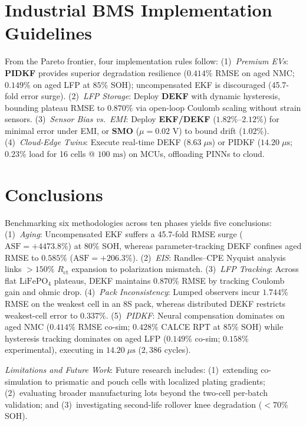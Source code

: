 \documentclass[preprint,12pt]{elsarticle}
\begin{document}
\section{Industrial BMS Implementation Guidelines}
From the Pareto frontier, four implementation rules follow: (1)~\emph{Premium EVs}: \textbf{PIDKF} provides superior degradation resilience ($0.414\%$ RMSE on aged NMC; $0.149\%$ on aged LFP at $85\%$ SOH); uncompensated EKF is discouraged (45.7-fold error surge). (2)~\emph{LFP Storage}: Deploy \textbf{DEKF} with dynamic hysteresis, bounding plateau RMSE to $0.870\%$ via open-loop Coulomb scaling without strain sensors. (3)~\emph{Sensor Bias vs.\ EMI}: Deploy \textbf{EKF/DEKF} ($1.82\%\text{--}2.12\%$) for minimal error under EMI, or \textbf{SMO} ($\mu = 0.02\text{ V}$) to bound drift ($1.02\%$). (4)~\emph{Cloud-Edge Twins}: Execute real-time DEKF ($8.63\;\mu\text{s}$) or PIDKF ($14.20\;\mu\text{s}$; $0.23\%$ load for 16 cells @ $100\text{ ms}$) on MCUs, offloading PINNs to cloud.

\section{Conclusions}
Benchmarking six methodologies across ten phases yields five conclusions: 
(1)~\emph{Aging}: Uncompensated EKF suffers a 45.7-fold RMSE surge ($\text{ASF} = +4473.8\%$) at $80\%$ SOH, whereas parameter-tracking DEKF confines aged RMSE to $0.585\%$ ($\text{ASF} = +206.3\%$). 
(2)~\emph{EIS}: Randles--CPE Nyquist analysis links $>150\%$ $R_{\text{ct}}$ expansion to polarization mismatch. 
(3)~\emph{LFP Tracking}: Across flat $\text{LiFePO}_4$ plateaus, DEKF maintains $0.870\%$ RMSE by tracking Coulomb gain and ohmic drop. 
(4)~\emph{Pack Inconsistency}: Lumped observers incur $1.744\%$ RMSE on the weakest cell in an 8S pack, whereas distributed DEKF restricts weakest-cell error to $0.337\%$. 
(5)~\emph{PIDKF}: Neural compensation dominates on aged NMC ($0.414\%$ RMSE co-sim; $0.428\%$ CALCE RPT at $85\%$ SOH) while hysteresis tracking dominates on aged LFP ($0.149\%$ co-sim; $0.158\%$ experimental), executing in $14.20\;\mu\text{s}$ ($2,386$ cycles).

\par\smallskip\noindent\emph{Limitations and Future Work}: Future research includes: (1)~extending co-simulation to prismatic and pouch cells with localized plating gradients; (2)~evaluating broader manufacturing lots beyond the two-cell per-batch validation; and (3)~investigating second-life rollover knee degradation ($<70\%$ SOH).
\end{document}
